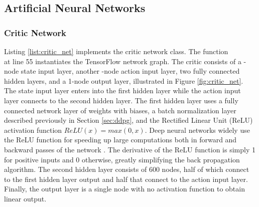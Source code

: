 \subsection{Artificial Neural Networks}
\subsubsection{Critic Network}
Listing \ref{list:critic_net} implements the critic network class. The function \\
\mbox{} at line 55 instantiates the TensorFlow network graph. The critic consists of a \mbox{-node} state input layer, another \mbox{-node} action input layer, two fully connected hidden layers, and a 1-node output layer, illustrated in Figure \ref{fig:critic_net}. The state input layer enters into the first hidden layer while the action input layer connects to the second hidden layer. The first hidden layer uses a fully connected network layer of weights with biases, a batch normalization layer described previously in Section \ref{sec:ddpg}, and the Rectified Linear Unit (ReLU) activation function $ReLU(x) = max(0,x)$. Deep neural networks widely use the ReLU function for speeding up large computations both in forward and backward passes of the network \cite{2017arXiv171005941R}. The derivative of the ReLU function is simply 1 for positive inputs and 0 otherwise, greatly simplifying the back propagation algorithm. The second hidden layer consists of 600 nodes, half of which connect to the first hidden layer output and half that connect to the action input layer. Finally, the output layer is a single node with no activation function to obtain linear output.

